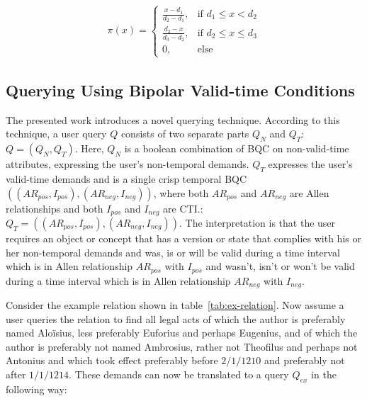 \documentclass[runningheads,a4paper]{llncs}
\begin{document}
\vspace{-10pt}
\begin{align}
\pi(x) =
\begin{cases}
\frac{x - d_1}{d_2 - d_1}, & \text{if } d_1 \leq x < d_2 \\
\frac{d_3 - x}{d_3 - d_2}, & \text{if } d_2 \leq x \leq d_3 \\
0, & \text{else}
\end{cases}
\end{align}


\subsection{Querying Using Bipolar Valid-time Conditions}
The presented work introduces a novel querying technique. According to this technique, a user query $Q$ consists of two separate parts $Q_N$ and $Q_T$: $Q = (Q_N, Q_T)$. Here, $Q_N$ is a boolean combination of BQC on non-valid-time attributes, expressing the user's non-temporal demands. $Q_T$ expresses the user's valid-time demands and is a single crisp temporal BQC $((AR_{pos}, I_{pos}), (AR_{neg}, I_{neg}))$, where both $AR_{pos}$ and $AR_{neg}$ are Allen relationships and both $I_{pos}$ and $I_{neg}$ are CTI.: $Q_T = ((AR_{pos}, I_{pos}), (AR_{neg}, I_{neg}))$. The interpretation is that the user requires an object or concept that has a version or state that complies with his or her non-temporal demands and was, is or will be valid during a time interval which is in Allen relationship $AR_{pos}$ with $I_{pos}$ and wasn't, isn't or won't be valid during a time interval which is in Allen relationship $AR_{neg}$ with $I_{neg}$.

Consider the example relation shown in table~\ref{tab:ex-relation}. Now assume a user queries the relation to find all legal acts of which the author is preferably named Alo\"isius, less preferably Euforius and perhaps Eugenius, and of which the author is preferably not named Ambrosius, rather not Theofilus and perhaps not Antonius and which took effect preferably before $2/1/1210$ and preferably not after $1/1/1214$. These demands can now be translated to a query $Q_{ex}$ in the following way:
\end{document}
